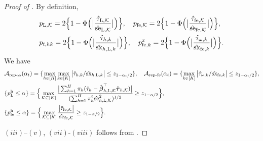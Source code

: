 \documentclass[12pt]{article}
\newcommand{\hpfe}{p_\textnormal{fe}^{\textnormal{h}}}
\newcommand{\se}{\textnormal{se}}
\newcommand{\Lin}{\textnormal{L}}
\newcommand{\wconv}{\stackrel{d}{\rightarrow}}
\newcommand{\mk}{\mathcal{K}}
\newcommand{\ma}{\mathcal{A}}
\newcommand{\rem}{\textnormal{rem}}
\newcommand{\remss}{\textnormal{rem-ss}}
\newcommand{\repss}{\textnormal{rep-ss}}
\newcommand{\repfe}{\textnormal{rep-fe}}
\newcommand{\fe}{\textnormal{fe}}
\newcommand{\bs}{\boldsymbol}
\newcommand{\sx}{\textnormal{sx}}
\newcommand{\hpL}{p_\textnormal{L}^{\textnormal{h}}}
\begin{document}
\begin{proof}[Proof of ]
 By definition,
   \begin{align*}
    & p_{\Lin, \mk} = 2\Big\{1-\Phi\Big(\big|\frac{\hat{\tau}_{\Lin,\mk}}{\hat{\se}_{\Lin,\mk}}\big|\Big)\Big\},\quad  p_{\fe , \mk} = 2\Big\{1-\Phi\Big(\big|\frac{\hat{\tau}_{\fe ,\mk}}{\hat{\se}_{\fe ,\mk}}\big|\Big)\Big\},\\
     & p_{t,hk} = 2\Big\{1-\Phi\Big(\big|\frac{\hat{\tau}_{h,k}}{\hat{\sx}_{h,\Lin,k}}\big|\Big) \Big\},\quad p_{\fe ,k}^{x} =  2\Big\{1-\Phi\Big(\big|\frac{\hat{\tau}_{\omega, k}}{\hat{\sx}_{\fe ,k}}\big|\Big)\Big\}.
   \end{align*}
   We have 
   \begin{align*}
   & \ma_{\repss}(\alpha_t) = \{\max_{h\in [H]}\max_{k\in [K]} \big|\hat{\tau}_{h,k}/\hat{\sx}_{h,\Lin,k}\big|  \leq z_{1-\alpha_t/2}\},\quad  \ma_{\repfe}(\alpha_t) = \{\max_{k\in [K]} \big|\hat{\tau}_{\omega, k}/\hat{\sx}_{\fe ,k}\big|  \leq z_{1-\alpha_t/2}\},\\
   &\{ \hpL \leq \alpha \} = \Big\{\max_{\mk \subseteq [K]}\frac{\big|\sum_{h=1}^H \pi_h(\hat{\tau}_{h} - \hat{\bs{\beta}}_{h,\Lin,\mk}^\top\hat{\bs{\tau}}_{h,\mk})\big|}{(\sum_{h=1}^H \pi_h^2 \hat{\se}_{h,\Lin,\mk}^2)^{1/2}} \geq z_{1-\alpha/2}\Big\},\\
   & \{\hpfe \leq \alpha\} = \Big\{\max_{\mk \subseteq [K]}\frac{\big|\hat{\tau}_{\fe ,\mk}\big|}{\hat{\se}_{\fe ,\mk}} \geq z_{1-\alpha/2}\Big\}.
\end{align*}

$(iii)$--$(v)$, $(vii)$-$(viii)$ follows  from .


\end{proof}
\end{document}
